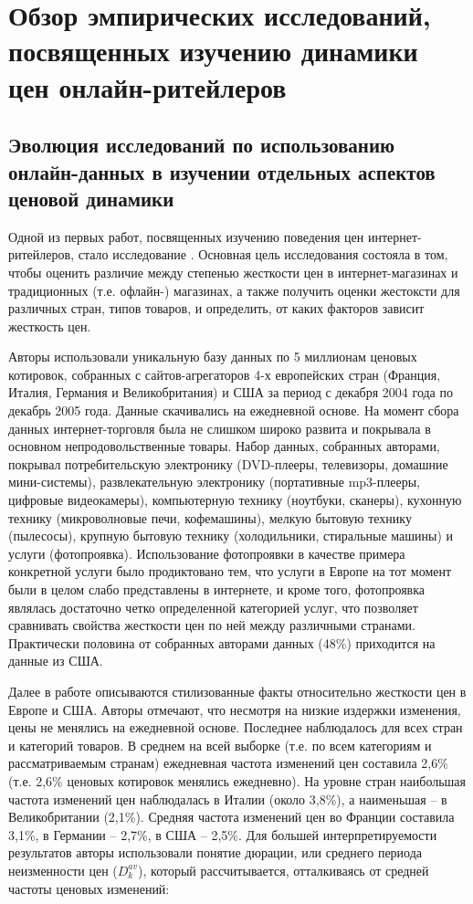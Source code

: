 \chapter{Обзор эмпирических исследований, посвященных изучению динамики цен онлайн-ритейлеров}\label{ch:ch1}

\section{Эволюция исследований по использованию онлайн-данных в изучении отдельных аспектов ценовой динамики}\label{sec:ch1/sec1}

Одной из первых работ, посвященных изучению поведения цен интернет-ритейлеров, стало исследование \cite{RePEc:ecb:ecbwps:2006645}. Основная цель исследования состояла в том, чтобы оценить различие между степенью жесткости цен в интернет-магазинах и традиционных (т.е. офлайн-) магазинах, а также получить оценки жестоксти для различных стран, типов товаров, и определить, от каких факторов зависит жесткость цен.

Авторы использовали уникальную базу данных по 5 миллионам ценовых котировок, собранных с сайтов-агрегаторов 4-х европейских стран (Франция, Италия, Германия и Великобритания) и США за период с декабря 2004 года по декабрь 2005 года. Данные скачивались на ежедневной основе. На момент сбора данных интернет-торговля была не слишком широко развита и покрывала в основном непродовольственные товары. Набор данных, собранных авторами, покрывал потребительскую электронику (DVD-плееры, телевизоры, домашние мини-системы), развлекательную электронику (портативные mp3-плееры, цифровые видеокамеры), компьютерную технику (ноутбуки, сканеры), кухонную технику (микроволновые печи, кофемашины), мелкую бытовую технику (пылесосы), крупную бытовую технику (холодильники, стиральные машины) и услуги (фотопроявка). Использование фотопроявки в качестве примера конкретной услуги было продиктовано тем, что услуги в Европе на тот момент были в целом слабо представлены в интернете, и кроме того, фотопроявка являлась достаточно четко определенной категорией услуг, что позволяет сравнивать свойства жесткости цен по ней между различными странами. Практически половина от собранных авторами данных (48\%) приходится на данные из США.

Далее в работе описываются стилизованные факты относительно жесткости цен в Европе и США. Авторы отмечают, что несмотря на низкие издержки изменения, цены не менялись на ежедневной основе. Последнее наблюдалось для всех стран и категорий товаров. В среднем на всей выборке (т.е. по всем категориям и рассматриваемым странам) ежедневная частота изменений цен составила 2,6\% (т.е. 2,6\% ценовых котировок менялись ежедневно). На уровне стран наибольшая частота изменений цен наблюдалась в Италии (около 3,8\%), а наименьшая – в Великобритании (2,1\%). Средняя частота изменений цен во Франции составила 3,1\%, в Германии – 2,7\%, в США – 2,5\%. Для большей интерпретируемости результатов авторы использовали понятие дюрации, или среднего периода неизменности цен ($D^{av}_{k}$), который рассчитывается, отталкиваясь от средней частоты ценовых изменений:

